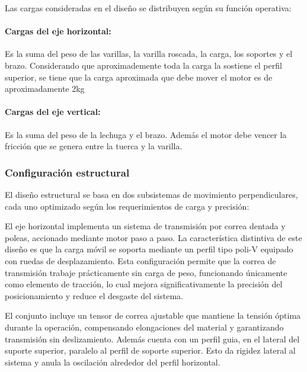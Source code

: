 Las cargas consideradas en el diseño se distribuyen según su función operativa:

\paragraph{Cargas del eje horizontal:}
Es la suma del peso de las varillas, la varilla roscada, la carga, los soportes y el brazo. Considerando que aproximademente toda la carga la sostiene el perfil superior, se tiene que la carga aproximada que debe mover el motor es de aproximadamente 2kg

\paragraph{Cargas del eje vertical:}
Es la suma del peso de la lechuga y el brazo. Además el motor debe vencer la fricción que se genera entre la tuerca y la varilla.

\subsubsection{Configuración estructural}

El diseño estructural se basa en dos subsistemas de movimiento perpendiculares, cada uno optimizado según los requerimientos de carga y precisión:

El eje horizontal implementa un sistema de transmisión por correa dentada y poleas, accionado mediante motor paso a paso. La característica distintiva de este diseño es que la carga móvil se soporta mediante un perfil tipo poli-V equipado con ruedas de desplazamiento. Esta configuración permite que la correa de transmisión trabaje prácticamente sin carga de peso, funcionando únicamente como elemento de tracción, lo cual mejora significativamente la precisión del posicionamiento y reduce el desgaste del sistema.

El conjunto incluye un tensor de correa ajustable que mantiene la tensión óptima durante la operación, compensando elongaciones del material y garantizando transmisión sin deslizamiento. Además cuenta con un perfil guia, en el lateral del suporte superior, paralelo al perfil de soporte superior. Esto da rigidez lateral al sistema y anula la oscilación alrededor del perfil horizontal.

